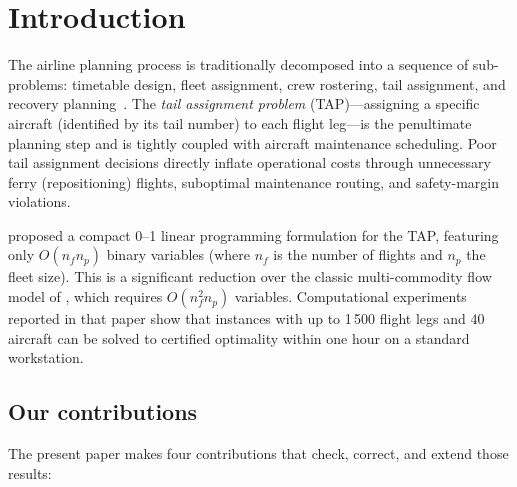\section{Introduction}
\label{sec:intro}

The airline planning process is traditionally decomposed into a sequence of
sub-problems: timetable design, fleet assignment, crew rostering, tail
assignment, and recovery planning~\citep{barnhart2003applications,
gopalan1998mathematical}.  The \emph{tail assignment problem} (TAP)—assigning
a specific aircraft (identified by its tail number) to each flight leg—is the
penultimate planning step and is tightly coupled with aircraft maintenance
scheduling.  Poor tail assignment decisions directly inflate operational costs
through unnecessary ferry (repositioning) flights, suboptimal maintenance
routing, and safety-margin violations.

\citet{khaled2018compact} proposed a compact 0--1 linear programming
formulation for the TAP, featuring only $O(n_f n_p)$ binary variables (where
$n_f$ is the number of flights and $n_p$ the fleet size).  This is a
significant reduction over the classic multi-commodity flow model of
\citet{levin1971scheduling}, which requires $O(n_f^2 n_p)$ variables.
Computational experiments reported in that paper show that instances with up
to 1\,500 flight legs and 40 aircraft can be solved to certified optimality
within one hour on a standard workstation.

\subsection*{Our contributions}

The present paper makes four contributions that check, correct, and extend
those results:


